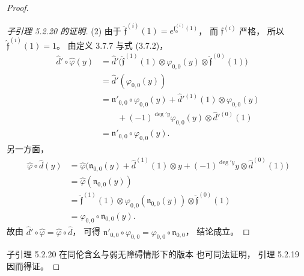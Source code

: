 \begin{proof}
\begin{proof}[子引理 5.2.20 的证明]
\textup{(2)} 由于
$\widehat{\mathfrak f}^{(i)}(1)
=e^{\mathfrak f_0^{(i)}(1)}$，
而 $\mathfrak f^{(i)}$ 严格，
所以 $\widehat{\mathfrak f}^{(i)}(1)=1$。
由定义 3.7.7 与式 (3.7.2)，
\[
\begin{aligned}
\widehat d'\circ\widehat\varphi(y)
&=\widehat d'\bigl(
\widehat{\mathfrak f}^{(1)}(1)
\otimes\varphi_{0,0}(y)
\otimes\widehat{\mathfrak f}^{(0)}(1)
\bigr)\\
&=\widehat d'(\varphi_{0,0}(y))\\
&=\mathfrak n'_{0,0}\circ\varphi_{0,0}(y)
+\widehat d'^{(1)}(1)\otimes\varphi_{0,0}(y)\\
&\qquad+(-1)^{\deg' y}
\varphi_{0,0}(y)\otimes\widehat d'^{(0)}(1)\\
&=\mathfrak n'_{0,0}\circ\varphi_{0,0}(y).
\end{aligned}
\]
另一方面，
\[
\begin{aligned}
\widehat\varphi\circ\widehat d(y)
&=\widehat\varphi\bigl(
\mathfrak n_{0,0}(y)
+\widehat d^{(1)}(1)\otimes y
+(-1)^{\deg' y}y\otimes\widehat d^{(0)}(1)
\bigr)\\
&=\widehat\varphi(\mathfrak n_{0,0}(y))\\
&=\widehat{\mathfrak f}^{(1)}(1)
\otimes\varphi_{0,0}(\mathfrak n_{0,0}(y))
\otimes\widehat{\mathfrak f}^{(0)}(1)\\
&=\varphi_{0,0}\circ\mathfrak n_{0,0}(y).
\end{aligned}
\]
故由 $\widehat d'\circ\widehat\varphi
=\widehat\varphi\circ\widehat d$，
可得
$\mathfrak n'_{0,0}\circ\varphi_{0,0}
=\varphi_{0,0}\circ\mathfrak n_{0,0}$，
结论成立。
\end{proof}

子引理 5.2.20 在同伦含幺与弱无障碍情形下的版本
也可同法证明，
引理 5.2.19 因而得证。
\end{proof}
